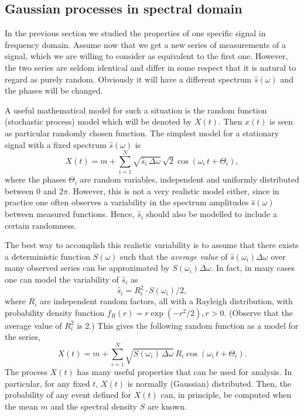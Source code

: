 \subsection{Gaussian processes in spectral domain}
In the previous section we studied the properties of one specific signal
in frequency domain. Assume now that we get a new series of measurements
of a signal, which we are willing to consider as equivalent to the
first one. However, the two series are seldom identical and differ in
some respect that it is natural to regard as purely random.
Obviously it will have a different spectrum $\hat{s}(\omega)$
and the phases will be changed.

A useful mathematical model for such a situation is the random
function (stochastic process) model which will be denoted by $X(t)$.
Then $x(t)$ is seen as particular randomly chosen function.
The simplest model for a stationary signal with a fixed
spectrum $\hat{s}(\omega)$ is
\begin{equation}
X(t)= m + \sum_{i=1}^N \sqrt{\hat{s}_i\, \Delta\omega} \,
\sqrt{2}\cos(\omega_i\,t+\Theta_i),
\label{eqn:sum_with_random_phases}
\end{equation}
where the phases $\Theta_i$ are random variables, independent and
uniformly distributed between $0$ and $2 \pi$.
However, this is not a very realistic model either, since in
practice one often observes a variability in the spectrum amplitudes 
$\hat{s}(\omega)$ between measured functions. Hence, $\hat{s}_i$
should also be modelled to include a certain randomness.

The best way to accomplish this realistic variability  
is to assume that there exists
a deterministic function $S(\omega)$ such that the {\it average value}
of $\widehat{s}(\omega_i)\Delta\omega$ over many observed series
can be approximated by $S(\omega_i)\Delta\omega$. In fact,
in many cases one can model the variability of $\hat{s}_i$ as
$$\hat{s}_i=R_i^2\cdot S(\omega_i)/2,$$
where $R_i$ are independent random factors, all with a Rayleigh distribution,
with probability density function $f_R(r)=r \exp (-r^2/2), r > 0$.
(Observe that the average value of $R_i^2$ is 2.)
This gives the following random function as a model for the series,
\begin{equation}
X(t)= m +
\sum_{i=1}^N \sqrt{S(\omega_i)\, \Delta\omega}\,
R_i\cos(\omega_i\,t+\Theta_i). \label{discretespectrumprocess}
\end{equation}
The process $X(t)$ has many useful properties that can be used for
analysis. In particular, for any fixed $t$, $X(t)$ is normally (Gaussian)
distributed. Then, the probability of any event defined for $X(t)$
can, in principle, be computed when the mean $m$ and the spectral
density $S$ are known.


